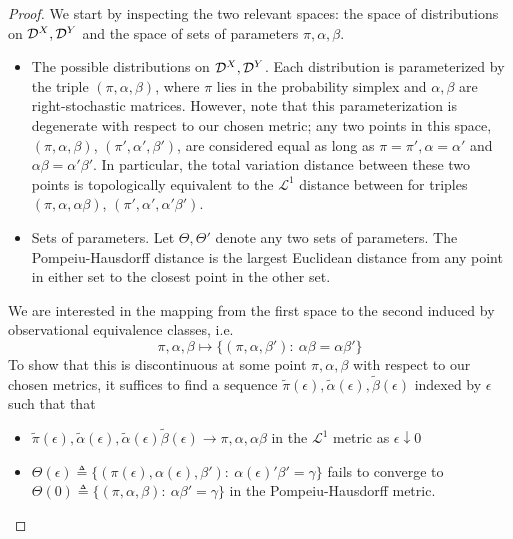 \documentclass{article}
\theoremstyle{definition}
\begin{document}

\begin{proof}
    We start by inspecting the two relevant spaces: the space of distributions on $\mathcal{D}^X,\mathcal{D}^Y$ and the space of sets of parameters $\pi,\alpha,\beta$.
    \begin{itemize}
        \item The possible distributions on $\mathcal{D}^X,\mathcal{D}^Y$.  Each distribution is parameterized by the triple $(\pi,\alpha,\beta)$, where $\pi$ lies in the probability simplex and $\alpha,\beta$ are right-stochastic matrices.  However, note that this parameterization is degenerate with respect to our chosen metric; any two points in this space, $(\pi,\alpha,\beta)$, $(\pi',\alpha',\beta')$, are considered equal as long as $\pi=\pi',\alpha=\alpha'$ and $\alpha\beta=\alpha'\beta'$.    In particular, the total variation distance between these two points is topologically equivalent to the $\mathscr{L}^1$ distance between for triples $(\pi,\alpha,\alpha \beta)$, $(\pi',\alpha',\alpha'\beta')$.  
        \item Sets of parameters.  Let $\Theta,\Theta'$ denote any two sets of parameters.  The Pompeiu-Hausdorff distance is the largest Euclidean distance from any point in either set to the closest point in the other set.
    \end{itemize}
    We are interested in the mapping from the first space to the second induced by observational equivalence classes, i.e.
    \[
    \pi,\alpha,\beta \mapsto \{(\pi,\alpha,\beta'):\ \alpha\beta=\alpha\beta'\}
    \]
    To show that this is discontinuous at some point $\pi,\alpha,\beta$ with respect to our chosen metrics, it suffices to find a sequence $\tilde \pi(\epsilon),\tilde \alpha(\epsilon),\tilde \beta(\epsilon)$ indexed by $\epsilon$ such that that 
    \begin{itemize}
        \item $\tilde \pi(\epsilon),\tilde \alpha(\epsilon),\tilde \alpha(\epsilon)\tilde\beta(\epsilon) \rightarrow \pi,\alpha,\alpha\beta$ in the $\mathscr{L}^1$ metric as $\epsilon\downarrow 0$
        \item $\Theta(\epsilon)\triangleq \{(\pi(\epsilon),\alpha(\epsilon),\beta'):\ \alpha(\epsilon)'\beta'=\gamma\}$ fails to converge to $\Theta(0)\triangleq \{(\pi,\alpha,\beta):\ \alpha\beta'=\gamma\}$ in the Pompeiu-Hausdorff metric.
    \end{itemize}

\end{proof}
\end{document}
